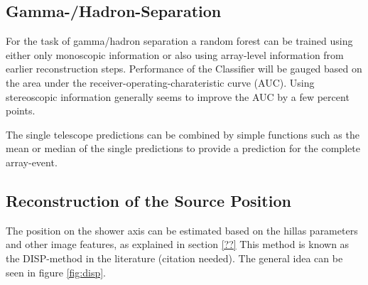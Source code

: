 \subsection{Gamma-/Hadron-Separation}
For the task of gamma/hadron separation a random forest can be trained
using either only monoscopic information or also using array-level
information from earlier reconstruction steps.
Performance of the Classifier will be gauged based 
on the area under the receiver-operating-charateristic curve (AUC).
Using stereoscopic information
generally seems to improve the AUC by a few percent points.

The single telescope predictions can be combined by
simple functions such as the mean or median of the
single predictions to provide a prediction for the complete
array-event.





\subsection{Reconstruction of the Source Position}
\label{sec:source_position}
The position on the shower axis can be estimated based on 
the hillas parameters and other image features, as 
explained in section \ref{??}
This method is known as the DISP-method in the
literature (citation needed). The general idea 
can be seen in figure \ref{fig:disp}.

